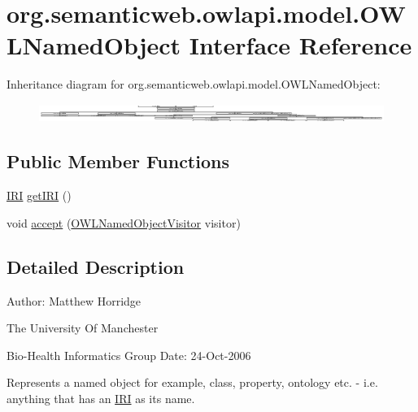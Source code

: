 \hypertarget{interfaceorg_1_1semanticweb_1_1owlapi_1_1model_1_1_o_w_l_named_object}{\section{org.\-semanticweb.\-owlapi.\-model.\-O\-W\-L\-Named\-Object Interface Reference}
\label{interfaceorg_1_1semanticweb_1_1owlapi_1_1model_1_1_o_w_l_named_object}
}
Inheritance diagram for org.\-semanticweb.\-owlapi.\-model.\-O\-W\-L\-Named\-Object\-:\begin{figure}[H]
\begin{center}
\leavevmode
\includegraphics[height=0.597470cm]{interfaceorg_1_1semanticweb_1_1owlapi_1_1model_1_1_o_w_l_named_object}
\end{center}
\end{figure}
\subsection*{Public Member Functions}
\begin{DoxyCompactItemize}
\item 
\hyperlink{classorg_1_1semanticweb_1_1owlapi_1_1model_1_1_i_r_i}{I\-R\-I} \hyperlink{interfaceorg_1_1semanticweb_1_1owlapi_1_1model_1_1_o_w_l_named_object_ad9f68efd7582e9cb01fd0aabc4694e80}{get\-I\-R\-I} ()
\item 
void \hyperlink{interfaceorg_1_1semanticweb_1_1owlapi_1_1model_1_1_o_w_l_named_object_add992275b3f8ffc92eb78011124f8c02}{accept} (\hyperlink{interfaceorg_1_1semanticweb_1_1owlapi_1_1model_1_1_o_w_l_named_object_visitor}{O\-W\-L\-Named\-Object\-Visitor} visitor)
\end{DoxyCompactItemize}


\subsection{Detailed Description}
Author\-: Matthew Horridge\par
 The University Of Manchester\par
 Bio-\/\-Health Informatics Group Date\-: 24-\/\-Oct-\/2006 

Represents a named object for example, class, property, ontology etc. -\/ i.\-e. anything that has an \hyperlink{classorg_1_1semanticweb_1_1owlapi_1_1model_1_1_i_r_i}{I\-R\-I} as its name. 


